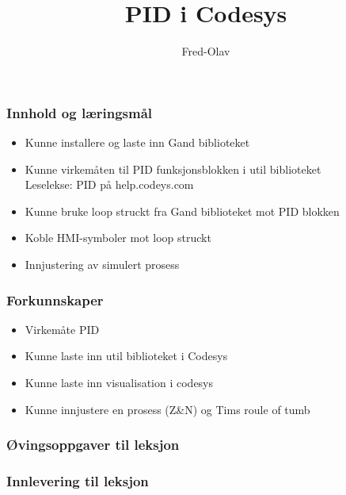 \documentclass{beamer}Leselekse til leksjon
\title{PID i Codesys}
\author{Fred-Olav}
\begin{document}
\maketitle

\begin{frame}
	\frametitle{Innhold og læringsmål}
	\begin{itemize}%
		\item Kunne installere og laste inn Gand biblioteket
		\item Kunne virkemåten til PID funksjonsblokken i util biblioteket \\Leselekse: PID på help.codeys.com
		\item Kunne bruke loop struckt fra Gand biblioteket mot PID blokken
		\item Koble HMI-symboler mot loop struckt
		\item Innjustering av simulert prosess
	\end{itemize}
\end{frame}

\begin{frame}
	\frametitle{Forkunnskaper}

	\begin{itemize}%
		\item Virkemåte PID
		\item Kunne laste inn util  biblioteket i Codesys 
		\item Kunne laste inn visualisation i codesys
		\item Kunne innjustere en prosess (Z\&N) og Tims roule of tumb
	\end{itemize}
\end{frame}

\begin{frame}
	\frametitle{Øvingsoppgaver til leksjon}
\end{frame}

\begin{frame}
	\frametitle{Innlevering til leksjon}
\end{frame}
\end{document}
